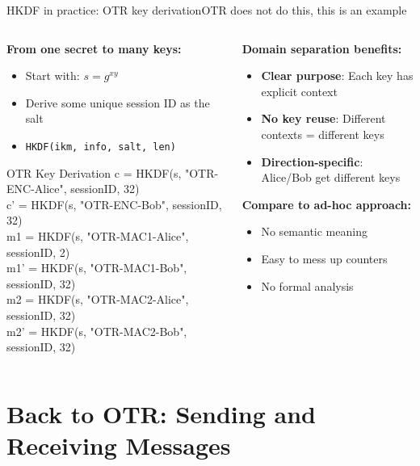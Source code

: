 \documentclass[aspectratio=169, lualatex, handout]{beamer}
\begin{document}
\begin{frame}{HKDF in practice: OTR key derivation}{OTR does not do this, this is an example}
	\begin{columns}[c]
		\begin{column}{0.5\textwidth}
			\textbf{From one secret to many keys:}
			\begin{itemize}
				\item Start with: $s = g^{xy}$
				\item Derive some unique session ID as the salt
				\item \texttt{HKDF(ikm, info, salt, len)}
			\end{itemize}
			\begin{exampleblock}{OTR Key Derivation}
				\ttfamily\scriptsize
				c = HKDF(s, "OTR-ENC-Alice", sessionID, 32)\\
				c' = HKDF(s, "OTR-ENC-Bob", sessionID, 32)\\
				m1 = HKDF(s, "OTR-MAC1-Alice", sessionID, 2)\\
				m1' = HKDF(s, "OTR-MAC1-Bob", sessionID, 32)\\
				m2 = HKDF(s, "OTR-MAC2-Alice", sessionID, 32)\\
				m2' = HKDF(s, "OTR-MAC2-Bob", sessionID, 32)
			\end{exampleblock}
		\end{column}
		\begin{column}{0.5\textwidth}
			\textbf{Domain separation benefits:}
			\begin{itemize}
				\item \textbf{Clear purpose}: Each key has explicit context
				\item \textbf{No key reuse}: Different contexts = different keys
				\item \textbf{Direction-specific}: Alice/Bob get different keys
			\end{itemize}
			\textbf{Compare to ad-hoc approach:}
			\begin{itemize}
				\item No semantic meaning
				\item Easy to mess up counters
				\item No formal analysis
			\end{itemize}
		\end{column}
	\end{columns}
\end{frame}

\section{Back to OTR: Sending and Receiving Messages}
\end{document}
